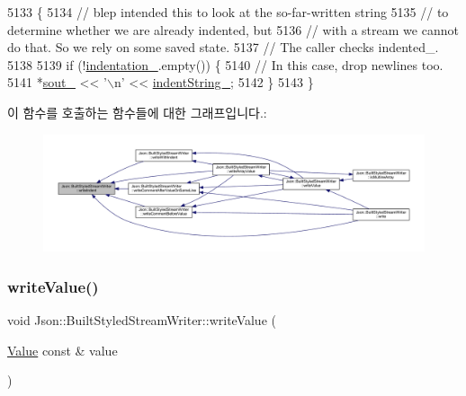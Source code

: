 \begin{DoxyCode}
5133                                           \{
5134   \textcolor{comment}{// blep intended this to look at the so-far-written string}
5135   \textcolor{comment}{// to determine whether we are already indented, but}
5136   \textcolor{comment}{// with a stream we cannot do that. So we rely on some saved state.}
5137   \textcolor{comment}{// The caller checks indented\_.}
5138 
5139   \textcolor{keywordflow}{if} (!\hyperlink{struct_json_1_1_built_styled_stream_writer_aaa4cbad91428ceca37cbabfc2a17a92d}{indentation\_}.empty()) \{
5140     \textcolor{comment}{// In this case, drop newlines too.}
5141     *\hyperlink{class_json_1_1_stream_writer_a4f5603d4228a9fa46a42cb44e5234d9b}{sout\_} << \textcolor{charliteral}{'\(\backslash\)n'} << \hyperlink{struct_json_1_1_built_styled_stream_writer_a0f8115a4fb474ab0e9de25f10e5ca09a}{indentString\_};
5142   \}
5143 \}
\end{DoxyCode}
이 함수를 호출하는 함수들에 대한 그래프입니다.\+:\nopagebreak
\begin{figure}[H]
\begin{center}
\leavevmode
\includegraphics[width=350pt]{struct_json_1_1_built_styled_stream_writer_a2b38a3714d415c4bd3b4812897130f3d_icgraph}
\end{center}
\end{figure}
\mbox{\label{struct_json_1_1_built_styled_stream_writer_a7c9da861861e570a51b45f270c9ff150}} 
\subsubsection{\texorpdfstring{write\+Value()}{writeValue()}}
{\footnotesize\ttfamily void Json\+::\+Built\+Styled\+Stream\+Writer\+::write\+Value (\begin{DoxyParamCaption}\item[{\hyperlink{class_json_1_1_value}{Value} const \&}]{value }\end{DoxyParamCaption})\hspace{0.3cm}{\ttfamily [private]}}



